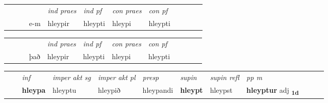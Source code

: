 \begin{tabular}{llllllllllll}
 & &  & &  \textit{ind praes} & \textit{ind pf} & \textit{con praes} & \textit{con pf} \\*
&  & & e-m & hleypir & hleypti & hleypi & hleypti \\*
\cmidrule{5-9}
\end{tabular}


\begin{tabular}{llllllllllll}
 & &  & &  \textit{ind praes} & \textit{ind pf} & \textit{con praes} & \textit{con pf} \\*
&  & & það & hleypir & hleypti & hleypi & hleypti \\*
\cmidrule{5-9}
\end{tabular}


\begin{tabular}{llllllllllll}
 & & \textit{inf} & \textit{imper akt sg} & \textit{imper akt pl}   & \textit{presp} & \textit{supin} & \textit{supin refl} & \textit{pp m}     \\*
  & & \textbf{hleypa} & hleyptu  & hleypið   & hleypandi &  \textbf{hleypt} & hleypst & \textbf{hleyptur} adj \textbf{\textsubscript{1d}} \\*
\cmidrule{1-12}
\end{tabular}



